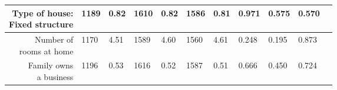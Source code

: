 \begin{longtable}{|r|l|l|l|l|l|l|l|l|l|l}
	\makecell{ Type of house: \\ Fixed structure}                                     & 1189                                                               &  0.82                                                              & 1610                                                               &  0.82                                                              & 1586                                                               &  0.81                                                              & 0.971                                                              & 0.575                                                              & 0.570                                                             \\

\hline

	 \makecell{Number of \\rooms at home}                                            & 1170                                                               &  4.51                                                              & 1589                                                               &  4.60                                                              & 1560                                                               &  4.61                                                              & 0.248                                                              & 0.195                                                              & 0.873                                                             \\

\hline

	 \makecell{Family owns\\ a business}                                             & 1196                                                               &  0.53                                                              & 1616                                                               &  0.52                                                              & 1587                                                               &  0.51                                                              & 0.666                                                              & 0.450                                                              & 0.724                                                             \\

\hline


\end{longtable}
